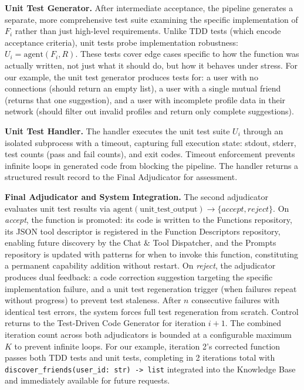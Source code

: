 \documentclass[sigconf,screen]{acmart}
\begin{document}
\textbf{Unit Test Generator.} After intermediate acceptance, the pipeline generates a separate, more comprehensive test suite examining the specific implementation of $F_i$ rather than just high-level requirements. Unlike TDD tests (which encode acceptance criteria), unit tests probe implementation robustness: $U_i = \text{agent}(F_i, R)$. These tests cover edge cases specific to how the function was actually written, not just what it should do, but how it behaves under stress. For our example, the unit test generator produces tests for: a user with no connections (should return an empty list), a user with a single mutual friend (returns that one suggestion), and a user with incomplete profile data in their network (should filter out invalid profiles and return only complete suggestions).

\textbf{Unit Test Handler.}     The handler executes the unit test suite $U_i$ through an isolated subprocess with a timeout, capturing full execution state: stdout, stderr, test counts (pass and fail counts), and exit codes. Timeout enforcement prevents infinite loops in generated code from blocking the pipeline. The handler returns a structured result record to the Final Adjudicator for assessment.

\textbf{Final Adjudicator and System Integration.} The second adjudicator evaluates unit test results via $\text{agent}(\text{unit\_test\_output}) \rightarrow \{\textit{accept}, \textit{reject}\}$. On \textit{accept}, the function is promoted: its code is written to the Functions repository, its JSON tool descriptor is registered in the Function Descriptors repository, enabling future discovery by the Chat \& Tool Dispatcher, and the Prompts repository is updated with patterns for when to invoke this function, constituting a permanent capability addition without restart. On \textit{reject}, the adjudicator produces dual feedback: a code correction suggestion targeting the specific implementation failure, and a unit test regeneration trigger (when failures repeat without progress) to prevent test staleness. After $n$ consecutive failures with identical test errors, the system forces full test regeneration from scratch. Control returns to the Test-Driven Code Generator for iteration $i+1$. The combined iteration count across both adjudicators is bounded at a configurable maximum $K$ to prevent infinite loops. For our example, iteration 2's corrected function passes both TDD tests and unit tests, completing in 2 iterations total with \texttt{discover\_friends(user\_id: str) -> list} integrated into the Knowledge Base and immediately available for future requests.
\end{document}
